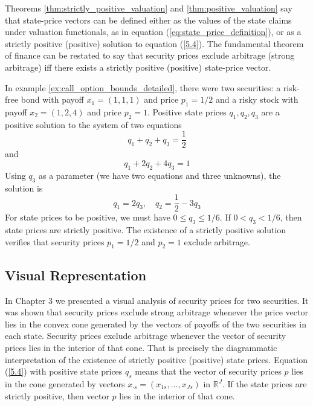 \documentclass[\topdir/lecture\_notes.tex]{subfiles}
\begin{document}
Theorems \ref{thm:strictly_positive_valuation} and \ref{thm:positive_valuation} say that state-price vectors can be defined either as the values of the state claims under valuation functionals, as in equation (\ref{eq:state_price_definition}), or as a strictly positive (positive) solution to equation (\ref{5.4}). The fundamental theorem of finance can be restated to say that security prices exclude arbitrage (strong arbitrage) iff there exists a strictly positive (positive) state-price vector.
\begin{example}\label{ex:bond_stock_state_prices} 
In example \ref{ex:call_option_bounds_detailed}, there were two securities: a risk-free bond with payoff $x_{1}=(1,1,1)$ and price $p_{1}=1 / 2$ and a risky stock with payoff $x_{2}=(1,2,4)$ and price $p_{2}=1$. Positive state prices $q_{1}, q_{2}, q_{3}$ are a positive solution to the system of two equations
\begin{equation*}
q_{1}+q_{2}+q_{3}=\frac{1}{2} 
\end{equation*}
and
\begin{equation*}
q_{1}+2 q_{2}+4 q_{3}=1 
\end{equation*}
Using $q_{3}$ as a parameter (we have two equations and three unknowns), the solution is
\begin{equation*}
q_{1}=2 q_{3}, \quad q_{2}=\frac{1}{2}-3 q_{3} 
\end{equation*}
For state prices to be positive, we must have $0 \leq q_{3} \leq 1 / 6$. If $0<q_{3}<1 / 6$, then state prices are strictly positive. The existence of a strictly positive solution verifies that security prices $p_{1}=1 / 2$ and $p_{2}=1$ exclude arbitrage.
\end{example}

\subsection{Visual Representation}
In Chapter 3 we presented a visual analysis of security prices for two securities. It was shown that security prices exclude strong arbitrage whenever the price vector lies in the convex cone generated by the vectors of payoffs of the two securities in each state. Security prices exclude arbitrage whenever the vector of security prices lies in the interior of that cone. That is precisely the diagrammatic interpretation of the existence of strictly positive (positive) state prices. Equation (\ref{5.4}) with positive state prices $q_{s}$ means that the vector of security prices $p$ lies in the cone generated by vectors $x_{\cdot s}=\left(x_{1 s}, \ldots, x_{J s}\right)$ in $\mathbb{R}^{J}$. If the state prices are strictly positive, then vector $p$ lies in the interior of that cone.
\end{document}
